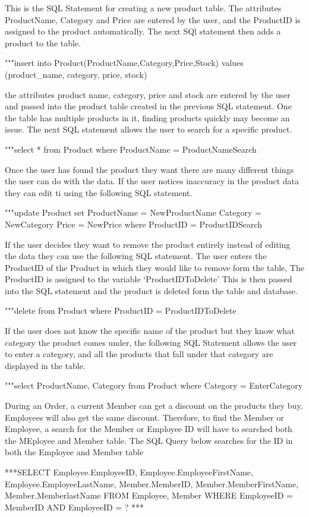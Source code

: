 This is the SQL Statement for creating a new product table. The attributes ProductName, Category and Price are entered by the user, and the ProductID is assigned to the product automatically. The next SQl statement then adds a product to the table.
\begin{sql}
"""insert into
Product(ProductName,Category,Price,Stock) values (product_name, category, price, stock)
\end{sql}

the attributes product name, category, price and stock are entered by the user and passed into the product table created in the previous SQL statement. One the table has multiple products in it, finding products quickly may become an issue. The next SQL statement allows the user to search for a specific product.
\begin{sql}
        	"""select *
        	 from Product
        	 where ProductName = ProductNameSearch
\end{sql}

Once the user has found the product they want there are many different things the user can do with the data. If the user notices inaccuracy in the product data they can edit ti using the following SQL statement.
\begin{sql}
	"""update Product set
	ProductName = NewProductName
	 Category = NewCategory
 	Price = NewPrice
 	where ProductID = ProductIDSearch
\end{sql}
If the user decides they want to remove the product entirely instead of editing the data they can use the following SQL statement. The user enters the ProductID of the Product in which they would like to remove form the table, The ProductID is assigned to the variable `ProductIDToDelete' This is then passed into the SQL statement and the product is deleted form the table and database.
\begin{sql}
	"""delete from Product
 where ProductID = ProductIDToDelete
\end{sql}
If the user does not know the specific name of the product but they know what category the product comes under, the following SQL Statement allows the user to enter a category, and all the products that fall under that category are displayed in the table.
\begin{sql}
	"""select ProductName, Category
	from Product
	where Category = EnterCategory
\end{sql}

During an Order, a current Member can get a discount on the products they buy. Employees will also get the same discount. Therefore, to find the Member or Employee, a search for the Member or Employee ID will have to searched both the MEployee and Member table. The SQL Query below searches for the ID in both the Employee and Member table
\begin{sql}
	***SELECT Employee.EmployeeID,  Employee.EmployeeFirstName,  Employee.EmployeeLastName,  Member.MemberID, Member.MemberFirstName, Member.MemberlastName  FROM   Employee, Member  WHERE EmployeeID = MemberID AND EmployeeID = ? ***
\end{sql}
  
